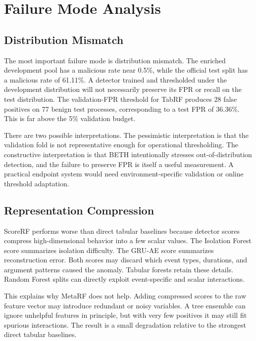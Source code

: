 \documentclass[journal]{IEEEtran}
\begin{document}
\section{Failure Mode Analysis}
\label{sec:failure}

\subsection{Distribution Mismatch}

The most important failure mode is distribution mismatch. The enriched development pool has a malicious rate near 0.5\%, while the official test split has a malicious rate of 61.11\%. A detector trained and thresholded under the development distribution will not necessarily preserve its FPR or recall on the test distribution. The validation-FPR threshold for TabRF produces 28 false positives on 77 benign test processes, corresponding to a test FPR of 36.36\%. This is far above the 5\% validation budget.

There are two possible interpretations. The pessimistic interpretation is that the validation fold is not representative enough for operational thresholding. The constructive interpretation is that BETH intentionally stresses out-of-distribution detection, and the failure to preserve FPR is itself a useful measurement. A practical endpoint system would need environment-specific validation or online threshold adaptation.

\subsection{Representation Compression}

ScoreRF performs worse than direct tabular baselines because detector scores compress high-dimensional behavior into a few scalar values. The Isolation Forest score summarizes isolation difficulty. The GRU-AE score summarizes reconstruction error. Both scores may discard which event types, durations, and argument patterns caused the anomaly. Tabular forests retain these details. Random Forest splits can directly exploit event-specific and scalar interactions.

This explains why MetaRF does not help. Adding compressed scores to the raw feature vector may introduce redundant or noisy variables. A tree ensemble can ignore unhelpful features in principle, but with very few positives it may still fit spurious interactions. The result is a small degradation relative to the strongest direct tabular baselines.
\end{document}
